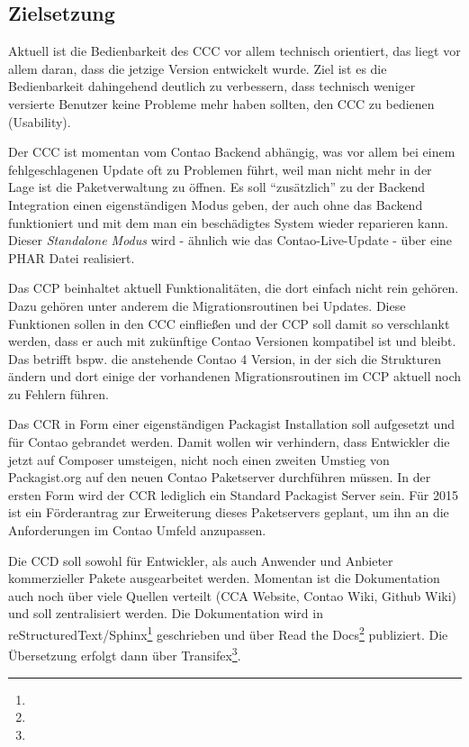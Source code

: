 \documentclass[
paper=a4,
draft=false,%
fontsize=10pt%
]{scrartcl}
\begin{document}
\subsection{Zielsetzung}

Aktuell ist die Bedienbarkeit des CCC vor allem technisch orientiert, das liegt vor allem daran, dass die jetzige Version  entwickelt wurde. Ziel ist es die Bedienbarkeit dahingehend deutlich zu verbessern, dass technisch weniger versierte Benutzer keine Probleme mehr haben sollten, den CCC zu bedienen (Usability).

Der CCC ist momentan vom Contao Backend abhängig, was vor allem bei einem fehlgeschlagenen Update oft zu Problemen führt, weil man nicht mehr in der Lage ist die Paketverwaltung zu öffnen. Es soll “zusätzlich” zu der Backend Integration einen eigenständigen Modus geben, der auch ohne das Backend funktioniert und mit dem man ein beschädigtes System wieder reparieren kann. Dieser \textit{Standalone Modus} wird - ähnlich wie das Contao-Live-Update - über eine PHAR Datei realisiert.

Das CCP beinhaltet aktuell Funktionalitäten, die dort einfach nicht rein gehören. Dazu gehören unter anderem die Migrationsroutinen bei Updates. Diese Funktionen sollen in den CCC einfließen und der CCP soll damit so verschlankt werden, dass er auch mit zukünftige Contao Versionen kompatibel ist und bleibt. Das betrifft bspw. die anstehende Contao 4 Version, in der sich die Strukturen ändern und dort einige der vorhandenen Migrationsroutinen im CCP aktuell noch zu Fehlern führen.

Das CCR in Form einer eigenständigen Packagist Installation soll aufgesetzt und für Contao gebrandet werden. Damit wollen wir verhindern, dass Entwickler die jetzt auf Composer umsteigen, nicht noch einen zweiten Umstieg von Packagist.org auf den neuen Contao Paketserver durchführen müssen. In der ersten Form wird der CCR lediglich ein Standard Packagist Server sein. Für 2015 ist ein Förderantrag zur Erweiterung dieses Paketservers geplant, um ihn an die Anforderungen im Contao Umfeld anzupassen.

Die CCD soll sowohl für Entwickler, als auch Anwender und Anbieter kommerzieller Pakete ausgearbeitet werden. Momentan ist die Dokumentation auch noch über viele Quellen verteilt (CCA Website, Contao Wiki, Github Wiki) und soll zentralisiert werden. Die Dokumentation wird in reStructuredText/Sphinx\footnote{} geschrieben und über Read the Docs\footnote{} publiziert. Die Übersetzung erfolgt dann über Transifex\footnote{}.
\end{document}
